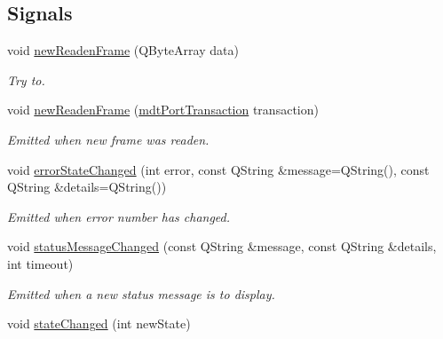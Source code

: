 \subsection*{Signals}
\begin{DoxyCompactItemize}
\item 
void \hyperlink{classmdt_port_manager_a77ef4a432306638f5b0f91df7863ac62}{newReadenFrame} (QByteArray data)
\begin{DoxyCompactList}\small\item\em Try to. \end{DoxyCompactList}\item 
void \hyperlink{classmdt_port_manager_a915ff3372cccd5f412b828cc81a3381f}{newReadenFrame} (\hyperlink{classmdt_port_transaction}{mdtPortTransaction} transaction)
\begin{DoxyCompactList}\small\item\em Emitted when new frame was readen. \end{DoxyCompactList}\item 
void \hyperlink{classmdt_port_manager_a7f9437d084e136d8d265dace7431395f}{errorStateChanged} (int error, const QString \&message=QString(), const QString \&details=QString())
\begin{DoxyCompactList}\small\item\em Emitted when error number has changed. \end{DoxyCompactList}\item 
void \hyperlink{classmdt_port_manager_a6f6c6f8a8430d8631a08c765565db9ab}{statusMessageChanged} (const QString \&message, const QString \&details, int timeout)
\begin{DoxyCompactList}\small\item\em Emitted when a new status message is to display. \end{DoxyCompactList}\item 
\hypertarget{classmdt_port_manager_a1c9e1848373831962b7ec83fd4fe5d35}{
void \hyperlink{classmdt_port_manager_a1c9e1848373831962b7ec83fd4fe5d35}{stateChanged} (int newState)}
\label{classmdt_port_manager_a1c9e1848373831962b7ec83fd4fe5d35}


\end{DoxyCompactItemize}
